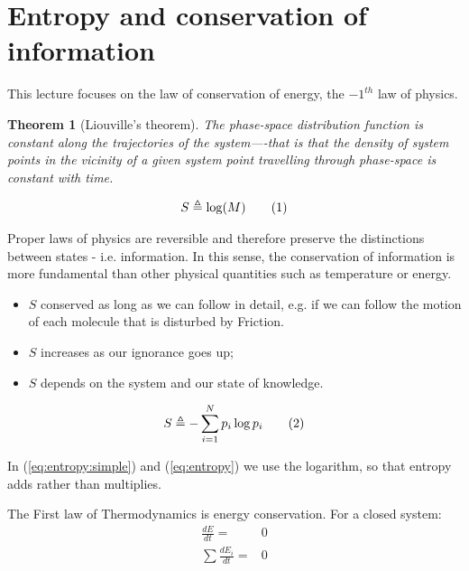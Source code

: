 \documentclass[]{article}
\newcommand\numberthis{\addtocounter{equation}{1}\tag{\theequation}}
\newtheorem{thm}{Theorem}
\begin{document}
\tableofcontents

\listoffigures


\section{Entropy and conservation of information}


This lecture focuses on the law of conservation of energy, the $-1^{th}$ law of physics. 

\begin{thm}[Liouville's theorem]
	The phase-space distribution function is constant along the trajectories of the system—-that is that the density of system points in the vicinity of a given system point travelling through phase-space is constant with time.
\end{thm}

\begin{align*}
S \triangleq \log(M) \numberthis \label{eq:entropy:simple}
\end{align*}

Proper laws of physics are reversible and therefore preserve the distinctions between states - i.e. information.  In this sense, the conservation of information is more fundamental than other physical quantities such as temperature or energy.  
\begin{itemize}
	\item $S$ conserved as long as we can follow in detail, e.g. if we can follow the motion of each molecule that is disturbed by Friction.
	\item $S$ increases as our ignorance goes up;
	\item $S$ depends on the system and our state of knowledge.
\end{itemize}

\begin{align*}
S \triangleq - \sum_{i=1}^{N} p_i \log{p_i} \numberthis \label{eq:entropy}
\end{align*}


In (\ref{eq:entropy:simple}) and (\ref{eq:entropy}) we use the logarithm, so that entropy adds rather than multiplies.

The First law of Thermodynamics is energy conservation. For a closed system:
\begin{align*}
\frac{dE}{dt} =& 0\\
\sum \frac{dE_i}{dt} =& 0
\end{align*}
\end{document}

